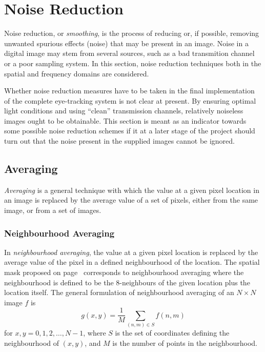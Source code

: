 
\section{Noise Reduction}
\label{image:noise}

Noise reduction, or {\em smoothing\/}, is the process of reducing or,
if possible, removing unwanted spurious effects (noise) that may be
present in an image.  Noise in a digital image may stem from several
sources, such as a bad transmition channel or a poor sampling system.
In this section, noise reduction techniques both in the spatial and
frequency domains are considered.

Whether noise reduction measures have to be taken in the final
implementation of the complete eye-tracking system is not clear at
present.  By ensuring optimal light conditions and using ``clean''
transmission channels, relatively noiseless images ought to be
obtainable.  This section is meant as an indicator towards some
possible noise reduction schemes if it at a later stage of the project
should turn out that the noise present in the supplied images cannot
be ignored.

\subsection{Averaging}
\label{image:noise:averaging}

{\em Averaging\/} is a general technique with which the value at a
given pixel location in an image is replaced by the average value of a
set of pixels, either from the same image, or from a set of images.

\subsubsection{Neighbourhood Averaging}

In {\em neighbourhood averaging\/}, the value at a given pixel
location is replaced by the average value of the pixel in a defined
neighbourhood of the location.  The spatial mask proposed on
page~\pageref{pg:image:spatial:mask} corresponds to neighbourhood
averaging where the neighbourhood is defined to be the 8-neighbours of
the given location plus the location itself.  The general formulation
of neighbourhood averaging of an $N\times N$ image $f$ is
\begin{equation}
\label{eq:averaging:neighbourhood}
  g(x,y)=\frac{1}{M}\sum_{(n,m)\in S}f(n,m)
\end{equation}
for $x,y=0,1,2,\ldots,N-1$, where $S$ is the set of coordinates
defining the neighbourhood of $(x,y)$, and $M$ is the number of points
in the neighbourhood.

